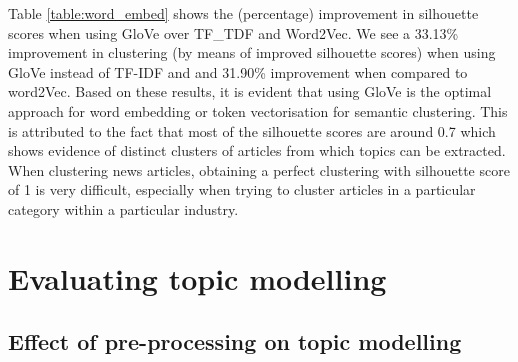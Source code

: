 Table \ref{table:word_embed} shows the (percentage) improvement in silhouette scores when using GloVe over TF\_TDF and Word2Vec. We see a 33.13\% improvement in clustering (by means of improved silhouette scores) when using GloVe instead of TF-IDF and and 31.90\% improvement when compared to word2Vec. Based on these results, it is evident that using GloVe is the optimal approach for word embedding or token vectorisation for semantic clustering. This is attributed to the fact that most of the silhouette scores are around 0.7 which shows evidence of distinct clusters of articles from which topics can be extracted. When clustering news articles, obtaining a perfect clustering with silhouette score of 1 is very difficult, especially when trying to cluster articles in a particular category within a particular industry. 

\section{Evaluating topic modelling} \label{s:evaluation_semantic_clustering}

\subsection{Effect of pre-processing on topic modelling} \label{s:preprocess_topic}

